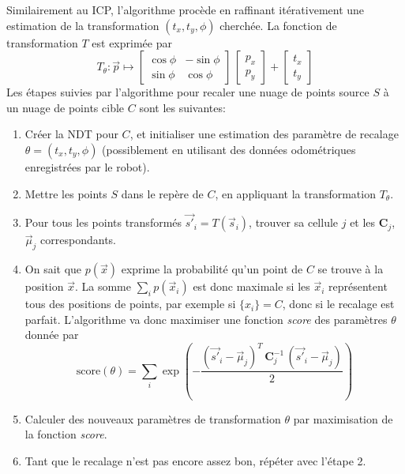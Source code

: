 \documentclass[a4paper,10pt]{scrreprt}
\begin{document}
Similairement au ICP, l'algorithme procède en raffinant itérativement une estimation de la transformation $(t_x, t_y, \phi)$ cherchée. La fonction de transformation $T$ est exprimée par
\begin{equation}
	T_{\theta} : \vec{p} \mapsto \begin{bmatrix}
		\cos \phi & - \sin \phi \\
		\sin \phi & \cos \phi
	\end{bmatrix} \, \begin{bmatrix}
		p_x \\
		p_y
	\end{bmatrix} + \begin{bmatrix}
		t_x \\
		t_y
	\end{bmatrix}
\end{equation}
Les étapes suivies par l'algorithme pour recaler une nuage de points source $S$ à un nuage de points cible $C$ sont les suivantes:
\begin{enumerate}
	\item Créer la NDT pour $C$, et initialiser une estimation des paramètre de recalage $\theta = (t_x, t_y, \phi)$ (possiblement en utilisant des données odométriques enregistrées par le robot).
	\item Mettre les points $S$ dans le repère de $C$, en appliquant la transformation $T_{\theta}$.
	\item Pour tous les points transformés $\vec{s'}_i = T(\vec{s}_i)$, trouver sa cellule $j$ et les $\mathbf{C}_j$, $\vec{\mu}_j$ correspondants.
	\item On sait que $p(\vec{x})$ exprime la probabilité qu'un point de $C$ se trouve à la position $\vec{x}$. La somme $\sum_i p(\vec{x}_i)$ est donc maximale si les $\vec{x}_i$ représentent tous des positions de points, par exemple si $\{ x_i \} = C$, donc si le recalage est parfait. L'algorithme va donc maximiser une fonction \emph{score} des paramètres $\theta$ donnée par
		\begin{equation}
			\text{score}(\theta) = \sum_{i} \exp \left( - \frac{ (\vec{s'}_i - \vec{\mu}_j)^T \, \mathbf{C}_j^{-1} \, (\vec{s'}_i - \vec{\mu}_j) }{2} \right)
		\end{equation}
	\item Calculer des nouveaux paramètres de transformation $\theta$ par maximisation de la fonction \emph{score}.
	\item Tant que le recalage n'est pas encore assez bon, répéter avec l'étape 2.
\end{enumerate}
\end{document}
